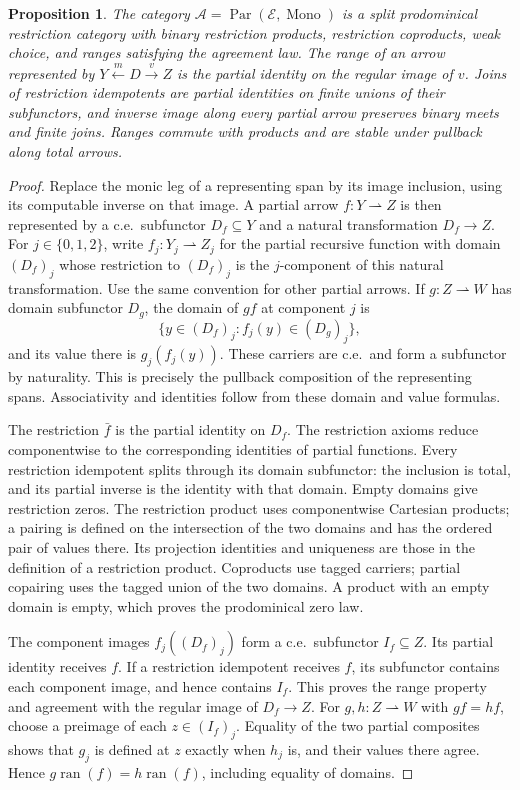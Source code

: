 \documentclass[11pt]{article}
\newtheorem{proposition}[theorem]{Proposition}
\newcommand{\ran}{\operatorname{ran}}
\begin{document}
\begin{proposition}\label{prop:fork-structure}
The category $\mathcal A=\operatorname{Par}(\mathcal E,
\operatorname{Mono})$ is a split prodominical restriction category
with binary restriction products, restriction coproducts, weak
choice, and ranges satisfying the agreement law. The range of an arrow
represented by $Y\xleftarrow{m}D\xrightarrow{v}Z$ is the partial
identity on the regular image of $v$.
Joins of restriction idempotents are partial identities on finite
unions of their subfunctors, and inverse image along every partial
arrow preserves binary meets and finite joins. Ranges commute with products and
are stable under pullback along total arrows.
\end{proposition}
\begin{proof}
Replace the monic leg of a representing span by its image
inclusion, using its computable inverse on that image. A partial
arrow $f:Y\rightharpoonup Z$ is then represented by a c.e.\ subfunctor
$D_f\subseteq Y$ and a natural transformation $D_f\to Z$.
For $j\in\{0,1,2\}$, write $f_j:Y_j\rightharpoonup Z_j$ for the
partial recursive function with domain $(D_f)_j$ whose restriction
to $(D_f)_j$ is the $j$-component of this natural transformation.
Use the same convention for other partial arrows.
If $g:Z\rightharpoonup W$ has domain subfunctor $D_g$, the domain of $gf$
at component $j$ is
\[
 \{y\in(D_f)_j:f_j(y)\in(D_g)_j\},
\]
and its value there is $g_j(f_j(y))$. These carriers are c.e.\
and form a subfunctor by naturality. This is precisely the
pullback composition of the representing spans. Associativity
and identities follow from these domain and value formulas.

The restriction $\bar f$ is the partial identity on $D_f$.
The restriction axioms reduce componentwise to the corresponding
identities of partial functions. Every restriction idempotent
splits through its domain subfunctor: the inclusion is total,
and its partial inverse is the identity with that domain.
Empty domains give restriction zeros. The restriction product
uses componentwise Cartesian products; a pairing is defined on
the intersection of the two domains and has the ordered pair
of values there. Its projection identities and uniqueness are
those in the definition of a restriction product. Coproducts
use tagged carriers; partial copairing uses the tagged union
of the two domains. A product with an empty domain is empty,
which proves the prodominical zero law.

The component images $f_j((D_f)_j)$ form a c.e.\ subfunctor
$I_f\subseteq Z$. Its partial identity receives $f$. If a restriction
idempotent receives $f$, its subfunctor contains each component image,
and hence contains $I_f$.
This proves the range property and agreement with the regular
image of $D_f\to Z$. For $g,h:Z\rightharpoonup W$ with
$gf=hf$, choose a preimage of each $z\in(I_f)_j$. Equality of the two partial composites shows
that $g_j$ is defined at $z$ exactly when $h_j$ is, and their
values there agree. Hence $g\ran(f)=h\ran(f)$, including
equality of domains.


\end{proof}
\end{document}
